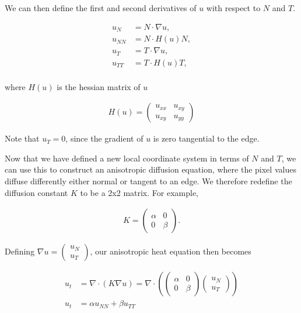 \documentclass[11pt,a4paper,noindent]{article}
\begin{document}
We can then define the first and second derivatives of $u$ with respect
to $N$ and $T$.

\begin{align}
u_N &= N \cdot \nabla u,\\
u_{NN} &= N \cdot H(u) N,\\
u_T &= T \cdot \nabla u,\\
u_{TT} &= T \cdot H(u) T,\\
\end{align}

where $H(u)$ is the hessian matrix of $u$

\begin{align}
H(u) = \begin{pmatrix} u_{xx} & u_{xy} \\ u_{xy} & u_{yy} \end{pmatrix}
\end{align}

Note that $u_T=0$, since the gradient of $u$ is zero
tangential to the edge.

Now that we have defined a new local coordinate system in terms of
$N$ and $T$, we can use this to construct an anisotropic
diffusion equation, where the pixel values diffuse differently either
normal or tangent to an edge. We therefore redefine the diffusion constant $K$ to be a
2x2 matrix. For example,

\begin{align}
K = \begin{pmatrix} \alpha & 0 \\ 0 & \beta \end{pmatrix}.
\end{align}

Defining $\nabla u = \begin{pmatrix}u_N \\ u_T \end{pmatrix}$, our anisotropic heat equation then becomes

\begin{align}
u_t &= \nabla \cdot (K\nabla u) = \nabla \cdot \left ( \begin{pmatrix} \alpha & 0 \\ 0 & \beta \end{pmatrix} \begin{pmatrix} u_N \\ u_T \end{pmatrix} \right )\\ 
u_t &= \alpha u_{NN} + \beta u_{TT}
\end{align}
\end{document}
